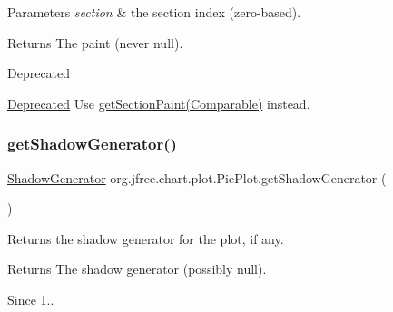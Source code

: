 \begin{DoxyParams}{Parameters}
{\em section} & the section index (zero-\/based).\\
\hline
\end{DoxyParams}
\begin{DoxyReturn}{Returns}
The paint (never {\ttfamily null}).
\end{DoxyReturn}
\begin{DoxyRefDesc}{Deprecated}
\item[\mbox{\hyperlink{deprecated__deprecated000068}{Deprecated}}]Use \mbox{\hyperlink{classorg_1_1jfree_1_1chart_1_1plot_1_1_pie_plot_a3de4031e87303ad438571b42b698324b}{get\+Section\+Paint(\+Comparable)}} instead. \end{DoxyRefDesc}
\mbox{\label{classorg_1_1jfree_1_1chart_1_1plot_1_1_pie_plot_a19e07e6891fef6f7645842473bee4d4d}} 
\subsubsection{\texorpdfstring{get\+Shadow\+Generator()}{getShadowGenerator()}}
{\footnotesize\ttfamily \mbox{\hyperlink{interfaceorg_1_1jfree_1_1chart_1_1util_1_1_shadow_generator}{Shadow\+Generator}} org.\+jfree.\+chart.\+plot.\+Pie\+Plot.\+get\+Shadow\+Generator (\begin{DoxyParamCaption}{ }\end{DoxyParamCaption})}

Returns the shadow generator for the plot, if any.

\begin{DoxyReturn}{Returns}
The shadow generator (possibly {\ttfamily null}).
\end{DoxyReturn}
\begin{DoxySince}{Since}
1.. 
\end{DoxySince}
\mbox{\label{classorg_1_1jfree_1_1chart_1_1plot_1_1_pie_plot_a0f084cdc0a89fbfaf5a2fa840c4bac03}} 
